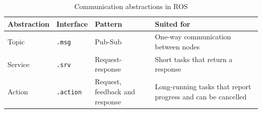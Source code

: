 \documentclass[a4paper]{book}
\begin{document}
\begin{table}[ht]
	\centering
	\begin{tabularx}{\textwidth}{l l l X}
		\hline
		\textbf{Abstraction} & \textbf{Interface} & \textbf{Pattern}               & \textbf{Suited for}                                          \\
		\hline
		Topic                & \texttt{.msg}      & Pub-Sub              & One-way communication between nodes                          \\
		Service              & \texttt{.srv}      & Request-response               & Short tasks that return a response                           \\
		Action               & \texttt{.action}   & Request, feedback and response & Long-running tasks that report progress and can be cancelled \\
		\hline
	\end{tabularx}
	\caption{Communication abstractions in ROS}
	\label{tab:ros-communication}
\end{table}
\end{document}
